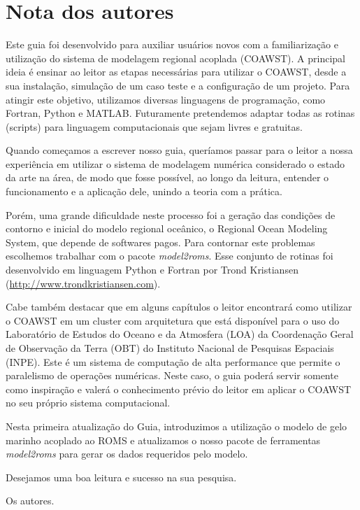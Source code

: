 \chapter*{Nota dos autores}

\noindent Este guia foi desenvolvido para auxiliar usuários novos com a familiarização e utilização do sistema de modelagem regional acoplada (COAWST). A principal ideia é ensinar ao leitor as etapas necessárias para utilizar o COAWST, desde a sua instalação, simulação de um caso teste e a configuração de um projeto. Para atingir este objetivo, utilizamos diversas linguagens de programação, como Fortran, Python e MATLAB. Futuramente pretendemos adaptar todas as rotinas (scripts) para linguagem computacionais que sejam livres e gratuitas.
\bigskip

\noindent Quando começamos a escrever nosso guia, queríamos passar para o leitor a nossa experiência em utilizar o sistema de modelagem numérica considerado o estado da arte na área, de modo que fosse possível, ao longo da leitura, entender o funcionamento e a aplicação dele, unindo a teoria com a prática.
\bigskip

\noindent Porém, uma grande dificuldade neste processo foi a geração das condições de contorno e inicial do modelo regional oceânico, o Regional Ocean Modeling System, que depende de softwares pagos. Para contornar este problemas escolhemos trabalhar com o pacote \textit{model2roms}. Esse conjunto de rotinas foi desenvolvido em linguagem Python e Fortran por Trond Kristiansen (\textcolor{bleu_cite}{\href{http://www.trondkristiansen.com}{http://www.trondkristiansen.com}}).
\bigskip

\noindent Cabe também destacar que em alguns capítulos o leitor encontrará como utilizar o COAWST em um cluster com arquitetura que está disponível para o uso do Laboratório de Estudos do Oceano e da Atmosfera (LOA) da Coordenação Geral de Observação da Terra (OBT) do Instituto Nacional de Pesquisas Espaciais (INPE). Este é um sistema de computação de alta performance que permite o paralelismo de operações numéricas. Neste caso, o guia poderá servir somente como inspiração e valerá o conhecimento prévio do leitor em aplicar o COAWST no seu próprio sistema computacional.
\bigskip

\noindent Nesta primeira atualização do Guia, introduzimos a utilização o modelo de gelo marinho acoplado ao ROMS e atualizamos o nosso pacote de ferramentas \textit{model2roms} para gerar os dados requeridos pelo modelo.
\bigskip

\noindent Desejamos uma boa leitura e sucesso na sua pesquisa.
\begin{flushright}
\noindent Os autores.
\end{flushright}

